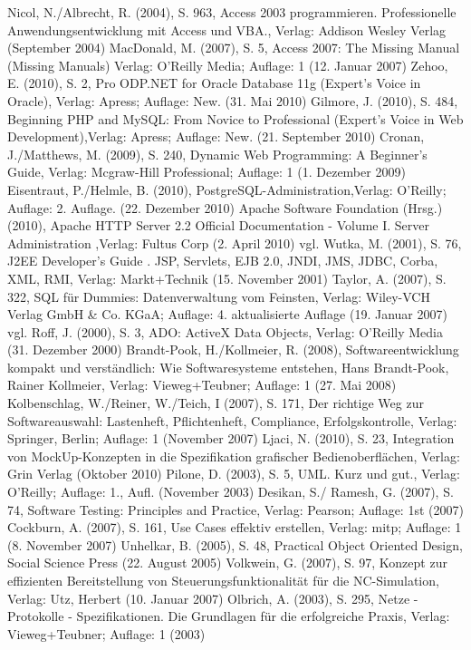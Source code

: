 Nicol, N./Albrecht, R. (2004), S. 963, Access 2003 programmieren. Professionelle Anwendungsentwicklung mit Access und VBA., Verlag: Addison Wesley Verlag (September 2004)
MacDonald, M. (2007), S. 5, Access 2007: The Missing Manual (Missing Manuals) Verlag: O'Reilly Media; Auflage: 1 (12. Januar 2007)
Zehoo, E. (2010), S. 2, Pro ODP.NET for Oracle Database 11g (Expert's Voice in Oracle), Verlag: Apress; Auflage: New. (31. Mai 2010)
Gilmore, J. (2010), S. 484, Beginning PHP and MySQL: From Novice to Professional (Expert's Voice in Web Development),Verlag: Apress; Auflage: New. (21. September 2010)
Cronan, J./Matthews, M. (2009), S. 240, Dynamic Web Programming: A Beginner's Guide, Verlag: Mcgraw-Hill Professional; Auflage: 1 (1. Dezember 2009)
Eisentraut, P./Helmle, B. (2010), PostgreSQL-Administration,Verlag: O'Reilly; Auflage: 2. Auflage. (22. Dezember 2010)
Apache Software Foundation (Hrsg.) (2010), Apache HTTP Server 2.2 Official Documentation - Volume I. Server Administration ,Verlag: Fultus Corp (2. April 2010)
vgl. Wutka, M. (2001), S. 76, J2EE Developer's Guide . JSP, Servlets, EJB 2.0, JNDI, JMS, JDBC, Corba, XML, RMI, Verlag: Markt+Technik (15. November 2001)
Taylor, A. (2007), S. 322, SQL für Dummies: Datenverwaltung vom Feinsten, Verlag: Wiley-VCH Verlag GmbH & Co. KGaA; Auflage: 4. aktualisierte Auflage (19. Januar 2007)
vgl. Roff, J. (2000), S. 3, ADO: ActiveX Data Objects, Verlag: O'Reilly Media (31. Dezember 2000)
Brandt-Pook, H./Kollmeier, R. (2008), Softwareentwicklung kompakt und verständlich: Wie Softwaresysteme entstehen, Hans Brandt-Pook, Rainer Kollmeier, Verlag: Vieweg+Teubner; Auflage: 1 (27. Mai 2008)
Kolbenschlag, W./Reiner, W./Teich, I (2007), S. 171, Der richtige Weg zur Softwareauswahl: Lastenheft, Pflichtenheft, Compliance, Erfolgskontrolle, Verlag: Springer, Berlin; Auflage: 1 (November 2007)
Ljaci, N. (2010), S. 23, Integration von MockUp-Konzepten in die Spezifikation grafischer Bedienoberflächen, Verlag: Grin Verlag (Oktober 2010)
Pilone, D. (2003), S. 5, UML. Kurz und gut., Verlag: O'Reilly; Auflage: 1., Aufl. (November 2003)
Desikan, S./ Ramesh, G. (2007), S. 74, Software Testing: Principles and Practice, Verlag: Pearson; Auflage: 1st (2007)
Cockburn, A. (2007), S. 161, Use Cases effektiv erstellen, Verlag: mitp; Auflage: 1 (8. November 2007)
Unhelkar, B. (2005), S. 48, Practical Object Oriented Design, Social Science Press (22. August 2005)
Volkwein, G. (2007), S. 97, Konzept zur effizienten Bereitstellung von Steuerungsfunktionalität für die NC-Simulation, Verlag: Utz, Herbert (10. Januar 2007)
Olbrich, A. (2003), S. 295, Netze - Protokolle - Spezifikationen. Die Grundlagen für die erfolgreiche Praxis, Verlag: Vieweg+Teubner; Auflage: 1 (2003)
